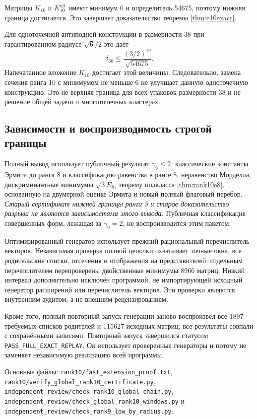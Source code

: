 \documentclass[11pt,a4paper]{article}
\theoremstyle{remark}\newtheorem{remark}[theorem]{Замечание}
\newcommand{\Kalt}{K_{10}^{\mathrm{alt}}}
\newcommand{\file}[1]{{\small\nolinkurl{#1}}}
\begin{document}
Матрицы $K_{10}$ и $\Kalt$ имеют минимум 6 и определитель 54675, поэтому нижняя граница достигается. Это завершает доказательство теоремы \ref{thm:e10exact}.

Для одноточечной антиподной конструкции в размерности 38 при гарантированном радиусе $\sqrt6/2$ это даёт
\[
\delta_{38}\le\frac{(3/2)^{19}}{\sqrt{54675}}.
\]
Напечатанное вложение $K_{10}$ достигает этой величины. Следовательно, замена сечения ранга 10 с минимумом не меньше 6 не улучшает данную одноточечную конструкцию. Это не верхняя граница для всех упаковок размерности 38 и не решение общей задачи о многоточечных кластерах.

\subsection{Зависимости и воспроизводимость строгой границы}

Полный вывод использует публичный результат $\gamma_9\le2$, классические константы Эрмита до ранга 8 и классификацию равенства в ранге 8, неравенство Морделла, дискриминантные минимумы $\sqrt3E_8$, теорему подкласса \ref{thm:rank10e8}, основанную на двумерной оценке Эрмита и новый полный флаговый перебор. \emph{Старый сертификат нижней границы ранга 9 и старое доказательство разрыва не являются зависимостями этого вывода.} Публичная классификация совершенных форм, лежащая за $\gamma_9=2$, не воспроизводится этим пакетом.

Оптимизированный генератор использует прежний рациональный перечислитель векторов. Независимая проверка полной цепочки охватывает точные окна, все родительские списки, отсечения и отображения на представителей; отдельным перечислителем перепроверены двойственные минимумы 8966 матриц. Низкий интервал дополнительно исключён программой, не импортирующей исходный генератор расширений или перечислитель векторов. Эти проверки являются внутренним аудитом, а не внешним рецензированием.

Кроме того, полный повторный запуск генерации заново воспроизвёл все 1897 требуемых списков родителей и 115627 исходных матриц; все результаты совпали с сохранёнными записями. Повторный запуск завершился статусом \file{PASS_FULL_EXACT_REPLAY}. Он использует проверенные генераторы и потому не заменяет независимую реализацию всей программы.

Основные файлы: \file{rank10/fast_extension_proof.txt},
\file{rank10/verify_global_rank10_certificate.py},
\file{independent_review/check_rank10_global_chain.py},
\file{independent_review/check_global_rank10_windows.py} и
\file{independent_review/check_rank9_low_by_radius.py}.
\end{document}
